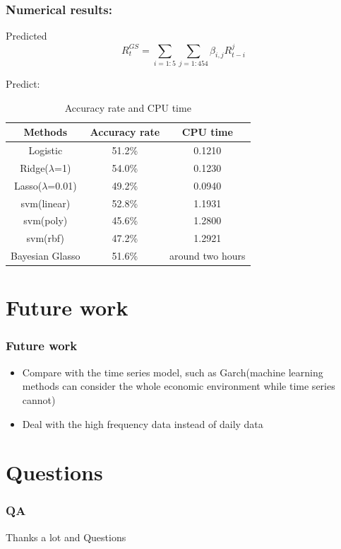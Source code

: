 \documentclass{beamer}
\begin{document}
\begin{frame}
\frametitle{Numerical results:}
\begin{block}{Predicted}
\begin{equation}
R_t^{GS} = \sum_{i=1:5}{\sum_{j=1:454}\beta_{i,j}R_{t-i}^j}
\end{equation}
\end{block}

\begin{block}{Predict:}
\begin{table}[h!]\large
  \caption{Accuracy rate and CPU time}
\begin{center}
    \begin{tabular}{| c | c|c|}
    \hline
    Methods& Accuracy rate& CPU time \\
    \hline
Logistic  &51.2\%&0.1210\\
Ridge($\lambda$=1)&54.0\%&0.1230\\
Lasso($\lambda$=0.01)&49.2\%&0.0940\\
svm(linear)&52.8\%&1.1931\\
svm(poly)&45.6\%&1.2800	\\
svm(rbf)&47.2\%&1.2921\\
Bayesian Glasso&51.6\%&around two hours\\
\hline
\end{tabular}
\end{center}
\end{table}
\end{block}
\end{frame}



\section{Future work}
\begin{frame}
\frametitle{Future work}
    \begin{itemize}
        \item  Compare with the time series model, such as Garch(machine learning methods can consider the whole economic environment while time series cannot)
        \item  Deal with the high frequency data instead of daily data
      \end{itemize}
\end{frame}

\section{Questions}
\begin{frame}
\frametitle{QA}
\begin{center}
\huge{Thanks a lot and Questions}
\end{center}
\end{frame}
%
%
\end{document}
